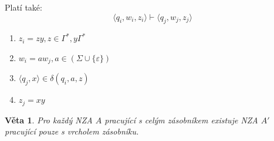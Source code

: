 \documentclass[10pt, a4paper, titlepage]{article}
\theoremstyle{note}
\newtheorem{veta}{\textbf{Věta}}
\begin{document}
Platí také:
$$
\langle q_i, w_i, z_i \rangle \vdash \langle q_j, w_j, z_j \rangle
$$
\begin{enumerate}
\item
$z_i = zy, z \in \Gamma^*, y \Gamma^*$

\item
$w_i = aw_j, a \in (\Sigma \cup \lbrace \varepsilon \rbrace)$

\item
$\langle q_j, x \rangle \in \delta(q_i, a, z)$

\item
$z_j = xy$
\end{enumerate}

\begin{veta}
Pro každý NZA $A$ pracující s celým zásobníkem existuje NZA $A'$ pracující pouze s vrcholem zásobníku.
\end{veta}
\end{document}
